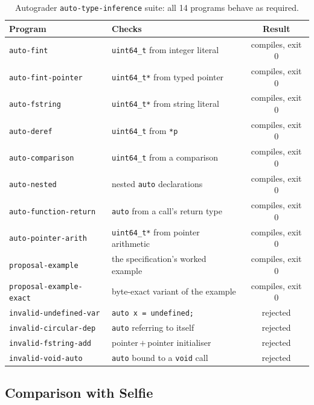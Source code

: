 \documentclass[a4paper,11pt]{article}
\begin{document}
\begin{table}[ht]
\centering
\caption{Autograder \texttt{auto-type-inference} suite: all 14 programs behave as required.}
\label{tab:grader}
\footnotesize
\begin{tabular}{llc}
\toprule
\textbf{Program} & \textbf{Checks} & \textbf{Result} \\
\midrule
\texttt{auto-fint}             & \texttt{uint64\_t} from integer literal            & compiles, exit 0 \\
\texttt{auto-fint-pointer}     & \texttt{uint64\_t*} from typed pointer             & compiles, exit 0 \\
\texttt{auto-fstring}          & \texttt{uint64\_t*} from string literal            & compiles, exit 0 \\
\texttt{auto-deref}            & \texttt{uint64\_t} from \texttt{*p}                & compiles, exit 0 \\
\texttt{auto-comparison}       & \texttt{uint64\_t} from a comparison               & compiles, exit 0 \\
\texttt{auto-nested}           & nested \texttt{auto} declarations                  & compiles, exit 0 \\
\texttt{auto-function-return}  & \texttt{auto} from a call's return type            & compiles, exit 0 \\
\texttt{auto-pointer-arith}    & \texttt{uint64\_t*} from pointer arithmetic        & compiles, exit 0 \\
\texttt{proposal-example}      & the specification's worked example                 & compiles, exit 0 \\
\texttt{proposal-example-exact}& byte-exact variant of the example                  & compiles, exit 0 \\
\midrule
\texttt{invalid-undefined-var} & \texttt{auto x = undefined;}                        & rejected \\
\texttt{invalid-circular-dep}  & \texttt{auto} referring to itself                  & rejected \\
\texttt{invalid-fstring-add}   & pointer\,$+$\,pointer initialiser                  & rejected \\
\texttt{invalid-void-auto}     & \texttt{auto} bound to a \texttt{void} call         & rejected \\
\bottomrule
\end{tabular}
\end{table}

\subsection{Comparison with Selfie}
\label{sec:comparison}
\end{document}
